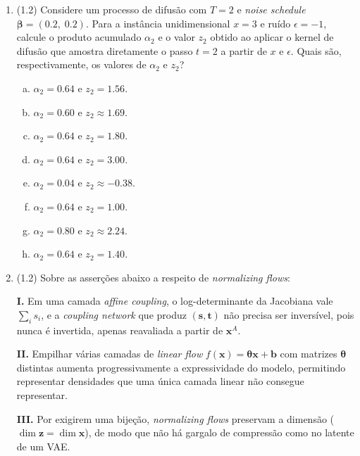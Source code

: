 \documentclass[11pt,a4paper]{article}
\begin{document}
\begin{enumerate}[1)]

\item (1.2) Considere um processo de difusão com $T = 2$ e \textit{noise schedule} $\boldsymbol{\beta} = (0.2,\; 0.2)$. Para a instância unidimensional $x = 3$ e ruído $\epsilon = -1$, calcule o produto acumulado $\alpha_2$ e o valor $z_2$ obtido ao aplicar o kernel de difusão que amostra diretamente o passo $t = 2$ a partir de $x$ e $\epsilon$. Quais são, respectivamente, os valores de $\alpha_2$ e $z_2$?
\begin{enumerate}[a)]
    \item $\alpha_2 = 0.64$ e $z_2 = 1.56$.
    \item $\alpha_2 = 0.60$ e $z_2 \approx 1.69$.
    \item $\alpha_2 = 0.64$ e $z_2 = 1.80$.
    \item $\alpha_2 = 0.64$ e $z_2 = 3.00$.
    \item $\alpha_2 = 0.04$ e $z_2 \approx -0.38$.
    \item $\alpha_2 = 0.64$ e $z_2 = 1.00$.
    \item $\alpha_2 = 0.80$ e $z_2 \approx 2.24$.
    \item $\alpha_2 = 0.64$ e $z_2 = 1.40$.
\end{enumerate}

\item (1.2) Sobre as asserções abaixo a respeito de \textit{normalizing flows}:

\textbf{I.} Em uma camada \textit{affine coupling}, o log-determinante da Jacobiana vale $\sum_i s_i$, e a \textit{coupling network} que produz $(\mathbf{s}, \mathbf{t})$ não precisa ser inversível, pois nunca é invertida, apenas reavaliada a partir de $\mathbf{x}^{A}$.

\textbf{II.} Empilhar várias camadas de \textit{linear flow} $f(\mathbf{x}) = \boldsymbol{\theta}\mathbf{x} + \mathbf{b}$ com matrizes $\boldsymbol{\theta}$ distintas aumenta progressivamente a expressividade do modelo, permitindo representar densidades que uma única camada linear não consegue representar.

\textbf{III.} Por exigirem uma bijeção, \textit{normalizing flows} preservam a dimensão ($\dim \mathbf{z} = \dim \mathbf{x}$), de modo que não há gargalo de compressão como no latente de um VAE.


\end{enumerate}
\end{document}
